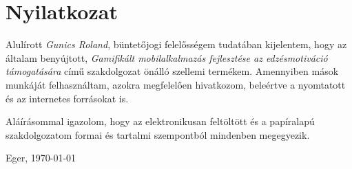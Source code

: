 \documentclass{thesis-ekf}
\begin{document}
\chapter*{Nyilatkozat}

Alulírott \emph{Gunics Roland}, büntetőjogi felelősségem tudatában kijelentem, hogy az általam benyújtott, \emph{Gamifikált mobilalkalmazás fejlesztése az edzésmotiváció támogatására} című szakdolgozat önálló szellemi termékem. Amennyiben mások munkáját felhasználtam, azokra megfelelően hivatkozom, beleértve a nyomtatott és az internetes forrásokat is.

Aláírásommal igazolom, hogy az elektronikusan feltöltött és a papíralapú szakdolgozatom formai és tartalmi szempontból mindenben megegyezik.

\bigskip
\begin{flushleft}
Eger, \today
\end{flushleft}

\medskip
\begin{flushright}
\end{flushright}

%
\end{document}
